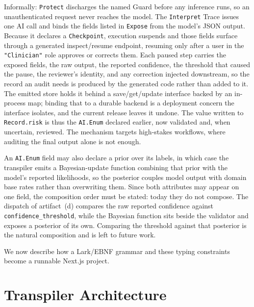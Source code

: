 \documentclass[sigconf]{acmart}
\begin{document}
Informally: \texttt{Protect} discharges the named Guard before any inference runs, so an unauthenticated request never reaches the model. The \texttt{Interpret} Trace issues one AI call and binds the fields listed in \texttt{Expose} from the model's JSON output. Because it declares a \texttt{Checkpoint}, execution suspends and those fields surface through a generated inspect/resume endpoint, resuming only after a user in the \texttt{"Clinician"} role approves or corrects them. Each paused step carries the exposed fields, the raw output, the reported confidence, the threshold that caused the pause, the reviewer's identity, and any correction injected downstream, so the record an audit needs is produced by the generated code rather than added to it. The emitted store holds it behind a save/get/update interface backed by an in-process map; binding that to a durable backend is a deployment concern the interface isolates, and the current release leaves it undone. The value written to \texttt{Record.risk} is thus the \texttt{AI.Enum} declared earlier, now validated and, when uncertain, reviewed. The mechanism targets high-stakes workflows, where auditing the final output alone is not enough.

An \texttt{AI.Enum} field may also declare a prior over its labels, in which case the transpiler emits a Bayesian-update function combining that prior with the model's reported likelihoods, so the posterior couples model output with domain base rates rather than overwriting them. Since both attributes may appear on one field, the composition order must be stated: today they do not compose. The dispatch of artifact~(d) compares the raw reported confidence against \texttt{confidence\_\allowbreak{}threshold}, while the Bayesian function sits beside the validator and exposes a posterior of its own. Comparing the threshold against that posterior is the natural composition and is left to future work.

We now describe how a Lark/EBNF grammar and these typing constraints become a runnable Next.js project.

\section{Transpiler Architecture}
\end{document}
